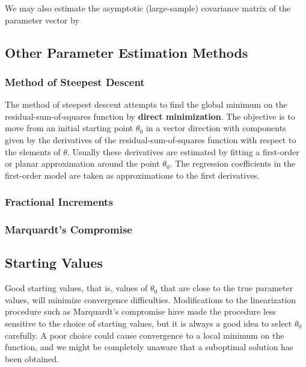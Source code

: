 \documentclass[12pt]{article}
\begin{document}
We may also estimate the asymptotic (large-sample) covariance matrix of the parameter vector by

\subsection{Other Parameter Estimation Methods}


\subsubsection*{Method of Steepest Descent}

The method of steepest descent attempts to find the global minimum on the residual-sum-of-squares function by \textbf{direct minimization}. The objective is to move from an initial starting point $\theta_0$ in a vector direction with components given by the derivatives of the residual-sum-of-squares function with respect to the elements of $\theta$. Usually these derivatives are estimated by fitting a first-order or planar approximation around the point $\theta_0$. The regression coefficients in the first-order model are taken as approximations to the first derivatives.

\subsubsection*{Fractional Increments}


\subsubsection*{Marquardt’s Compromise}




\subsection{Starting Values}

Good starting values, that is, values of $\theta_0$ that are close to the true parameter values, will minimize convergence difficulties. Modifications to the linearization procedure such as Marquardt’s compromise have made the procedure less sensitive to the choice of starting values, but it is always a good idea to select $\theta_0$ carefully. A poor choice could cause convergence to a local minimum on the function, and we might be completely unaware that a suboptimal solution has been obtained.


\end{document}
